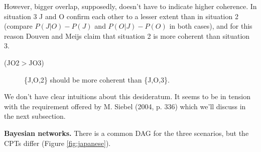 \documentclass[
  10pt,
]{scrartcl}
\newcommand{\s}[1]{\textsf{#1}}
\begin{document}
However, bigger overlap, supposedly, doesn't have to indicate higher coherence. In situation 3 \s{J} and \s{O} confirm each other to a lesser extent than in situation 2 (compare \(P(J|O)-P(J)\) and \(P(O|J)-P(O)\) in both cases), and for this reason Douven and Meijs claim that situation 2 is more coherent than situation 3.
\vspace{2mm}

\begin{description}
    \item[(\s{JO2}$>$\s{JO3})]  \{\s{J,O,2}\} should be more coherent than \{\s{J,O,3}\}.
\end{description}\vspace{2mm}

\noindent We don't have clear intuitions about this desideratum. It seems to be in tension with the requirement offered by M. Siebel (2004, p. 336) which we'll discuss in the next subsection.

\textbf{Bayesian networks.} There is a common DAG for the three scenarios, but the CPTs differ (Figure \ref{fig:japanese}).
\end{document}

